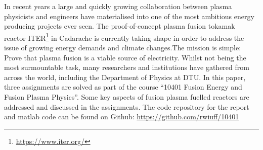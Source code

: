 In recent years a large and quickly growing collaboration between plasma physicists and engineers have materialised into one of the most ambitious energy producing projects ever seen. The proof-of-concept plasma fusion tokamak reactor ITER\footnote{\url{https://www.iter.org/}} in Cadarache is currently taking shape in order to address the issue of growing energy demands and climate changes.\newline The mission is simple: Prove that plasma fusion is a viable source of electricity.\newline
Whilst not being the most surmountable task, many researchers and institutions have gathered from across the world, including the Department of Physics at DTU.\newline
In this paper, three assignments are solved as part of the course ``10401 Fusion Energy and Fusion Plasma Physics''. Some key aspects of fusion plasma fuelled reactors are addressed and discussed in the assignments.
The code repository for the report and matlab code can be found on Github: \url{https://github.com/rwiuff/10401}\ \faGithub

